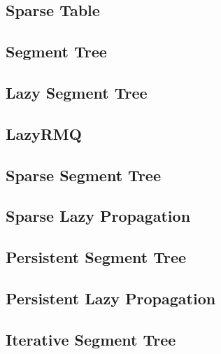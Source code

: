 \subsection{Sparse Table}
\raggedbottom
\hrulefill
\subsection{Segment Tree}
\raggedbottom
\hrulefill
\subsection{Lazy Segment Tree}
\raggedbottom
\hrulefill
\subsection{LazyRMQ}
\raggedbottom
\hrulefill
\subsection{Sparse Segment Tree}
\raggedbottom
\hrulefill
\subsection{Sparse Lazy Propagation}
\raggedbottom
\hrulefill
\subsection{Persistent Segment Tree}
\raggedbottom
\hrulefill
\subsection{Persistent Lazy Propagation}
\raggedbottom
\hrulefill
\subsection{Iterative Segment Tree}
\raggedbottom
\hrulefill
\newpage

